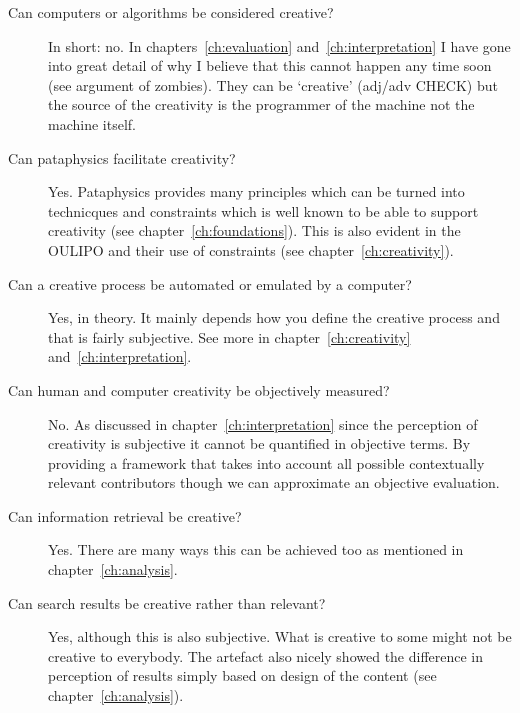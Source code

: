 \begin{description}
  \item[Can computers or algorithms be considered creative?] In short: no. In chapters~\ref{ch:evaluation} and~\ref{ch:interpretation} I have gone into great detail of why I believe that this cannot happen any time soon (see argument of zombies). They can be `creative' (adj/adv CHECK) but the source of the creativity is the programmer of the machine not the machine itself.
  \item[Can pataphysics facilitate creativity?] Yes. Pataphysics provides many principles which can be turned into technicques and constraints which is well known to be able to support creativity (see chapter~\ref{ch:foundations}). This is also evident in the \ac{OULIPO} and their use of constraints (see chapter~\ref{ch:creativity}).
  \item[Can a creative process be automated or emulated by a computer?] Yes, in theory. It mainly depends how you define the creative process and that is fairly subjective. See more in chapter~\ref{ch:creativity} and~\ref{ch:interpretation}.
  \item[Can human and computer creativity be objectively measured?] No. As discussed in chapter~\ref{ch:interpretation} since the perception of creativity is subjective it cannot be quantified in objective terms. By providing a framework that takes into account all possible contextually relevant contributors though we can approximate an objective evaluation.
  \item[Can information retrieval be creative?] Yes. There are many ways this can be achieved too as mentioned in chapter~\ref{ch:analysis}.
  \item[Can search results be creative rather than relevant?] Yes, although this is also subjective. What is creative to some might not be creative to everybody. The artefact also nicely showed the difference in perception of results simply based on design of the content (see chapter~\ref{ch:analysis}).
\end{description}



